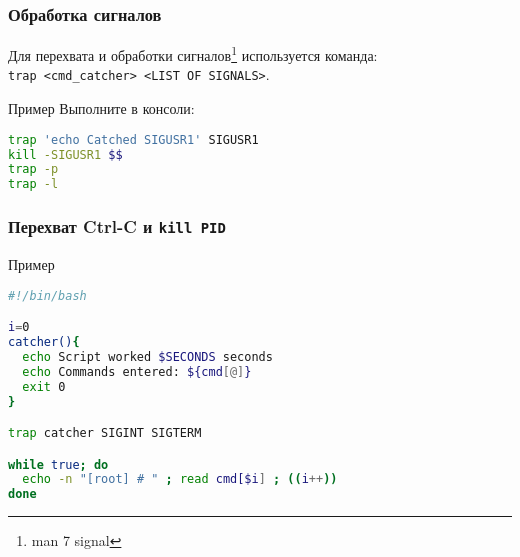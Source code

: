 \begin{frame}[fragile]
	\frametitle{Обработка сигналов}
	
	Для перехвата и обработки сигналов\footnote{man 7 signal} используется команда:\\
	{\tt trap <cmd_catcher> <LIST OF SIGNALS>}.

	\begin{block}{Пример}
		Выполните в консоли:
			\begin{lstlisting}[language=sh]
trap 'echo Catched SIGUSR1' SIGUSR1
kill -SIGUSR1 $$
trap -p
trap -l
			\end{lstlisting}
	\end{block}
\end{frame}

\begin{frame}[fragile]
	\frametitle{Перехват Ctrl-C и {\tt kill PID}}
	
	\begin{block}{Пример}
		\begin{lstlisting}[language=sh]
#!/bin/bash

i=0
catcher(){
  echo Script worked $SECONDS seconds
  echo Commands entered: ${cmd[@]}
  exit 0
}

trap catcher SIGINT SIGTERM

while true; do
  echo -n "[root] # " ; read cmd[$i] ; ((i++))
done
		\end{lstlisting}
	\end{block}
\end{frame}


